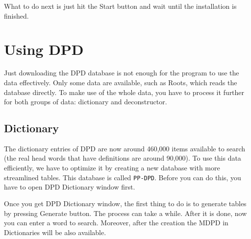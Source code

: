 What to do next is just hit the Start button and wait until the installation is finished.


\section{Using DPD}

Just downloading the DPD database is not enough for the program to use the data effectively. Only some data are available, such as Roots, which reads the database directly. To make use of the whole data, you have to process it further for both groups of data: dictionary and deconstructor.

\subsection{Dictionary}

The dictionary entries of DPD are now around 460,000 items available to search (the real head words that have definitions are around 90,000). To use this data efficiently, we have to optimize it by creating a new database with more streamlined tables. This database is called \texttt{PP-DPD}. Before you can do this, you have to open DPD Dictionary window first.


Once you get DPD Dictionary window, the first thing to do is to generate tables by pressing {\faSix {}} Generate button. The process can take a while. After it is done, now you can enter a word to search. Moreover, after the creation the MDPD in Dictionaries will be also available.


